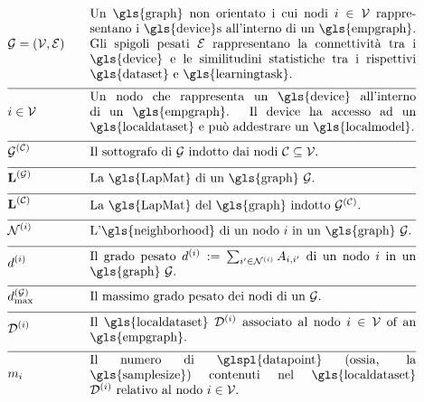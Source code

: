 \begin{align}
 	&\graph = \pair{\nodes}{\edges} & \quad & \parbox{.75\textwidth}{Un \gls{graph} non orientato i cui nodi $\nodeidx \in \nodes$ rappresentano i 
	\gls{device}s all'interno di un \gls{empgraph}. Gli spigoli pesati $\edges$ rappresentano la connettività tra i 
	\gls{device} e le similitudini statistiche tra i rispettivi \gls{dataset} e \gls{learningtask}.}\nonumber \\[2mm] \hline \nonumber\\[-5mm]
&\nodeidx \in \nodes& \quad & \parbox{.75\textwidth}{Un nodo che rappresenta un 
	\gls{device} all'interno di un \gls{empgraph}. Il device ha accesso ad un \gls{localdataset} e può addestrare un \gls{localmodel}.}\nonumber \\[2mm] \hline \nonumber\\[-5mm]
	&\indsubgraph{\graph}{\cluster}& \quad & \parbox{.75\textwidth}{Il sottografo di $\graph$ indotto dai nodi $\cluster \subseteq \nodes$.} \nonumber \\[2mm] \hline \nonumber\\[-5mm]
	&\LapMat{\graph}   & \quad & \parbox{.75\textwidth}{La \gls{LapMat} di un \gls{graph} $\graph$.}\nonumber \\[2mm] \hline \nonumber\\[-5mm]
		&\LapMat{\cluster}   & \quad & \parbox{.75\textwidth}{La \gls{LapMat} del \gls{graph} indotto $\indsubgraph{\graph}{\cluster}$.} \nonumber \\[2mm] \hline \nonumber\\[-5mm]
	 &		\neighbourhood{\nodeidx}  & \quad & \parbox{.75\textwidth}{L'\gls{neighborhood} di un nodo $\nodeidx$ in un \gls{graph} $\graph$.}   \nonumber \\[2mm] \hline \nonumber\\[-5mm]
	&\nodedegree{\nodeidx} & \quad & \parbox{.75\textwidth}{Il grado pesato $\nodedegree{\nodeidx}\defeq \sum_{\nodeidx' \in \neighbourhood{\nodeidx}} \edgeweight_{\nodeidx,\nodeidx'}$ di un nodo $\nodeidx$ in un \gls{graph} $\graph$.}  \nonumber \\[2mm] \hline \nonumber\\[-5mm]
	&\maxnodedegree^{(\graph)} & \quad & \parbox{.75\textwidth}{Il massimo grado pesato dei nodi di un $\graph$.} \nonumber \\[2mm] \hline \nonumber\\[-5mm] 
&\localdataset{\nodeidx} & \quad & \parbox{.75\textwidth}{Il \gls{localdataset} $\localdataset{\nodeidx}$ associato al nodo $\nodeidx\in \nodes$ of an \gls{empgraph}.} \nonumber \\[2mm] \hline \nonumber\\[-5mm]
&\localsamplesize{\nodeidx} & \quad & \parbox{.75\textwidth}{Il numero di \glspl{datapoint} (ossia, la \gls{samplesize}) contenuti nel 
			\gls{localdataset} $\localdataset{\nodeidx}$ relativo al nodo $\nodeidx\in \nodes$.} \nonumber 
\end{align} 
